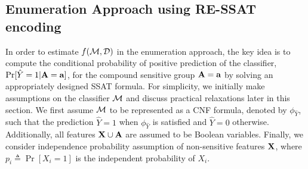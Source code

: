 \subsection{Enumeration Approach  using RE-SSAT encoding}
\label{fairness_justicia_sec:enumeration_ssat}
In order to estimate $ f(\mathcal{M}, \mathcal{D}) $ in the enumeration approach, the key idea  is to compute the conditional probability of positive prediction of the classifier, $\Pr[\hat{Y} = 1 | \mathbf{A} = \mathbf{a}]$, for the compound sensitive group $\mathbf{A} = \mathbf{a}$ by solving an appropriately designed SSAT formula.  For simplicity, we  initially make assumptions on the classifier $ \mathcal{M} $ and discuss practical relaxations later in this section.  We first assume $\mathcal{M}$ to be represented as a CNF formula, denoted by $\phi_{\hat{Y}}$, such that the prediction $ \hat{Y} = 1 $ when $ \phi_{\hat{Y}}$ is satisfied and  $\hat{Y} =0$ otherwise. Additionally, all features $ \mathbf{X} \cup \mathbf{A} $ are assumed to be Boolean variables.  Finally, we consider independence probability assumption of non-sensitive features $ \mathbf{X} $, where $p_i \triangleq \Pr[X_i = 1] $ is the independent probability of $ X_i $. 



